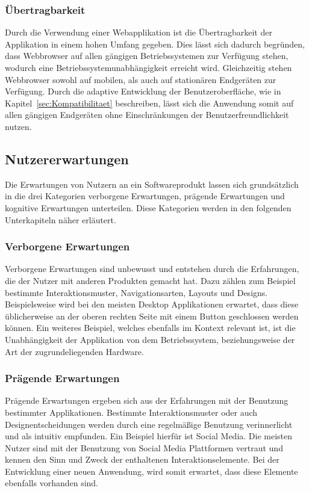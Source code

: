 \subsubsection{Übertragbarkeit}
Durch die Verwendung einer Webapplikation ist die Übertragbarkeit der Applikation in einem hohen Umfang gegeben.
Dies lässt sich dadurch begründen, dass Webbrowser auf allen gängigen Betriebssystemen zur Verfügung stehen, wodurch eine Betriebssystemunabhängigkeit erreicht wird.
Gleichzeitig stehen Webbrowser sowohl auf mobilen, als auch auf stationären Endgeräten zur Verfügung.
Durch die adaptive Entwicklung der Benutzeroberfläche, wie in Kapitel~\ref{sec:Kompatibilitaet} beschreiben, lässt sich die Anwendung somit auf allen gängigen Endgeräten ohne Einschränkungen der Benutzerfreundlichkeit nutzen.

\subsection{Nutzererwartungen}
Die Erwartungen von Nutzern an ein Softwareprodukt lassen sich grundsätzlich in die drei Kategorien verborgene Erwartungen, prägende Erwartungen und kognitive Erwartungen unterteilen.
Diese Kategorien werden in den folgenden Unterkapiteln näher erläutert.

\subsubsection{Verborgene Erwartungen}
Verborgene Erwartungen sind unbewusst und entstehen durch die Erfahrungen, die der Nutzer mit anderen Produkten gemacht hat.
Dazu zählen zum Beispiel bestimmte Interaktionsmuster, Navigationsarten, Layouts und Designs.
Beispielsweise wird bei den meisten Desktop Applikationen erwartet, dass diese üblicherweise an der oberen rechten Seite mit einem Button geschlossen werden können.
Ein weiteres Beispiel, welches ebenfalls im Kontext  relevant ist, ist die Unabhängigkeit der Applikation von dem Betriebssystem, beziehungsweise der Art der zugrundeliegenden Hardware.

\subsubsection{Prägende Erwartungen}
Prägende Erwartungen ergeben sich aus der Erfahrungen mit der Benutzung bestimmter Applikationen.
Bestimmte Interaktionsmuster oder auch Designentscheidungen werden durch eine regelmäßige Benutzung verinnerlicht und als intuitiv empfunden.
Ein Beispiel hierfür ist Social Media.
Die meisten Nutzer sind mit der Benutzung von Social Media Plattformen vertraut und kennen den Sinn und Zweck der enthaltenen Interaktionselemente.
Bei der Entwicklung einer neuen Anwendung, wird somit erwartet, dass diese Elemente ebenfalls vorhanden sind.

